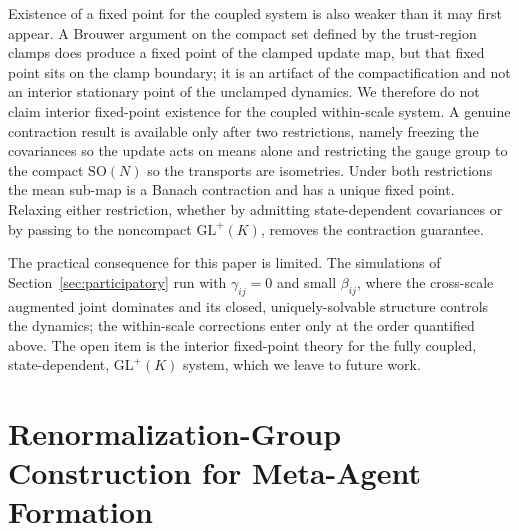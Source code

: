 \documentclass[11pt]{article}
\begin{document}
Existence of a fixed point for the coupled system is also weaker than it may first appear. A Brouwer argument on the compact set defined by the trust-region clamps does produce a fixed point of the clamped update map, but that fixed point sits on the clamp boundary; it is an artifact of the compactification and not an interior stationary point of the unclamped dynamics. We therefore do not claim interior fixed-point existence for the coupled within-scale system. A genuine contraction result is available only after two restrictions, namely freezing the covariances so the update acts on means alone and restricting the gauge group to the compact $\mathrm{SO}(N)$ so the transports are isometries. Under both restrictions the mean sub-map is a Banach contraction and has a unique fixed point. Relaxing either restriction, whether by admitting state-dependent covariances or by passing to the noncompact $\mathrm{GL}^+(K)$, removes the contraction guarantee.

The practical consequence for this paper is limited. The simulations of Section~\ref{sec:participatory} run with $\gamma_{ij} = 0$ and small $\beta_{ij}$, where the cross-scale augmented joint dominates and its closed, uniquely-solvable structure controls the dynamics; the within-scale corrections enter only at the order quantified above. The open item is the interior fixed-point theory for the fully coupled, state-dependent, $\mathrm{GL}^+(K)$ system, which we leave to future work.

\section{Renormalization-Group Construction for Meta-Agent Formation}
\label{sec:meta_agent_rg}
\end{document}
